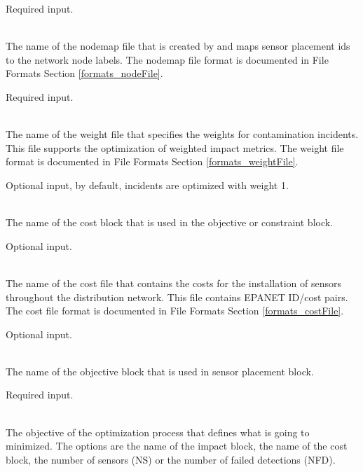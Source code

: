 \begin{description}[topsep=0pt,parsep=0.5em,itemsep=-0.4em]
\begin{description}[topsep=0pt,parsep=0.5em,itemsep=-0.4em]
                Required input.
    \item[{nodemap file}]\hfill
\\The name of the nodemap file that is created by  and 
                maps sensor placement ids to the network node labels. 
                The nodemap file format is documented in File Formats Section \ref{formats_nodeFile}.
                
                Required input.
    \item[{weight file}]\hfill
\\The name of the weight file that specifies the weights for contamination
                incidents. This file supports the optimization of weighted
                impact metrics. 
                The weight file format is documented in File Formats Section \ref{formats_weightFile}.
                
                Optional input, by default, incidents are optimized with weight 1.
  \end{description}
  \item[{cost}]\hfill
  \begin{description}[topsep=0pt,parsep=0.5em,itemsep=-0.4em]
    \item[{name}]\hfill
\\The name of the cost block that is used in the objective or constraint block.
                
                Optional input.
    \item[{cost file}]\hfill
\\The name of the cost file that contains the costs for the installation of
                sensors throughout the distribution network. This file contains
                EPANET ID/cost pairs.
                The cost file format is documented in File Formats Section \ref{formats_costFile}.
                
                Optional input.
  \end{description}
  \item[{objective}]\hfill
  \begin{description}[topsep=0pt,parsep=0.5em,itemsep=-0.4em]
    \item[{name}]\hfill
\\The name of the objective block that is used in sensor placement block.
                
                Required input.
    \item[{goal}]\hfill
\\The objective of the optimization process that defines what is going to minimized. 
                The options are the name of the impact block, the name of the cost block, 
                the number of sensors (NS) or the number of failed detections (NFD).
				

\end{description}
\end{description}
